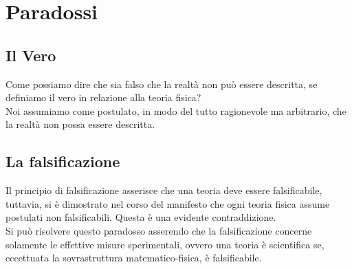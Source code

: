 \documentclass[]{article}
\begin{document}
	\section{Paradossi}
	\subsection{Il Vero}
	Come possiamo dire che sia falso che la realtà non può essere descritta, se definiamo il vero in relazione alla teoria fisica?\\
	Noi assumiamo come postulato, in modo del tutto ragionevole ma arbitrario, che la realtà non possa essere descritta.
	\subsection{La falsificazione}
	Il principio di falsificazione asserisce che una teoria deve essere falsificabile, tuttavia, si è dimostrato nel corso del manifesto che ogni teoria fisica assume postulati non falsificabili. Questa è una evidente contraddizione.\\
	Si può risolvere questo paradosso asserendo che la falsificazione concerne solamente le effettive misure sperimentali, ovvero una teoria è scientifica se, eccettuata la sovrastruttura matematico-fisica, è falsificabile.
\end{document}
